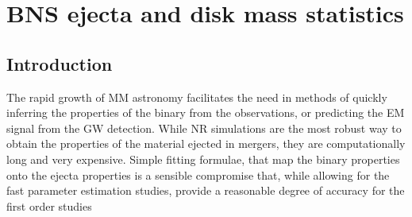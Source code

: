 
\chapter{\ac{BNS} ejecta and disk mass statistics} %

\label{ch:stat} %

\newcommand{\DSrefset}{\texttt{M0RefSet}} 
\newcommand{\DSheatcool}{\texttt{M0/M1Set}} 
\newcommand{\DScool}{\texttt{LeakSet}}
\newcommand{\DSnone}{\texttt{NoNusSet}}

\def\chid{\chi_{\nu}^2}
\def\non{\nonumber}





\section{Introduction}

The rapid growth of \ac{MM} astronomy facilitates the need in methods of quickly inferring 
the properties of the binary from the observations, or predicting the \ac{EM} signal from 
the \ac{GW} detection.
%
While \ac{NR} simulations are the most robust way to obtain the properties of the material
ejected in mergers, they are computationally long and very expensive. 
%
Simple fitting formulae, that map the binary properties onto the ejecta properties is a sensible
compromise that, while allowing for the fast parameter estimation studies, provide a reasonable 
degree of accuracy for the first order studies 
%

